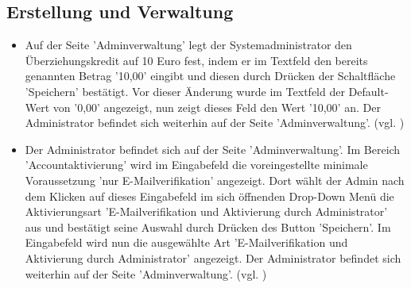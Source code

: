 \documentclass[a4paper]{scrreprt}
\begin{document}
		\subsection{Erstellung und Verwaltung}
			\begin{itemize}
				\item {} 
				 Auf der Seite 'Adminverwaltung' legt der Systemadministrator den Überziehungskredit auf 10 Euro fest, indem er im Textfeld den bereits genannten Betrag '10,00' eingibt und diesen durch Drücken der Schaltfläche 'Speichern' bestätigt. Vor dieser Änderung wurde im Textfeld der Default-Wert von '0,00' angezeigt, nun zeigt dieses Feld den Wert '10,00' an. Der Administrator befindet sich weiterhin auf der Seite 'Adminverwaltung'. (vgl. )
				
				\item {}
				 Der Administrator befindet sich auf der Seite 'Adminverwaltung'. Im Bereich 'Accountaktivierung' wird im Eingabefeld die voreingestellte minimale Voraussetzung 'nur E-Mailverifikation' angezeigt. Dort wählt der Admin nach dem Klicken auf dieses Eingabefeld im sich öffnenden Drop-Down Menü die Aktivierungsart 'E-Mailverifikation und Aktivierung durch Administrator' aus und bestätigt seine Auswahl durch Drücken des Button 'Speichern'. Im Eingabefeld wird nun die ausgewählte Art 'E-Mailverifikation und Aktivierung durch Administrator' angezeigt. Der Administrator befindet sich weiterhin auf der Seite 'Adminverwaltung'. (vgl. )
				

\end{itemize}
\end{document}
